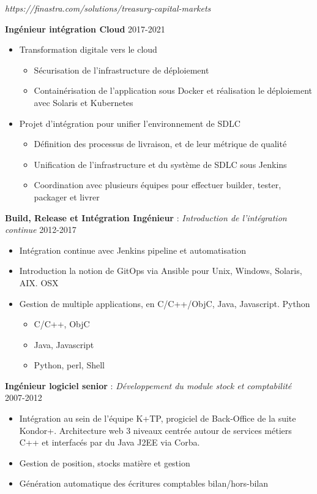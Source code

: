 \documentclass[11pt,a4paper]{moderncv}
\begin{document}
{
\textit{https://finastra.com/solutions/treasury-capital-markets}
\bigskip

\textbf{Ingénieur intégration Cloud} \hfill 2017-2021
\bigskip
	\begin{itemize}%
		\item Transformation digitale vers le cloud
			\begin{itemize}%
				\item Sécurisation de l'infrastructure de déploiement
				\item Containérisation de l'application sous Docker et réalisation le déploiement avec Solaris et Kubernetes
			\end{itemize}
	\end{itemize}
\bigskip
	\begin{itemize}%
	\item	Projet d'intégration pour unifier l'environnement de SDLC
		\begin{itemize}%
				\item Définition des processus de livraison, et de leur métrique de qualité
				\item Unification de l'infrastructure et du système de SDLC sous Jenkins
				\item Coordination avec plusieurs équipes pour effectuer builder, tester, packager  et livrer
		\end{itemize}
	\end{itemize}
\bigskip
 \textbf{Build, Release et Intégration Ingénieur} : \textit{Introduction de l'intégration continue} \hfill 2012-2017
\bigskip
			\begin{itemize}%
				\item Intégration continue avec Jenkins pipeline et automatisation
                \item Introduction la notion de GitOps via Ansible pour Unix, Windows, Solaris, AIX. OSX
				\item Gestion de multiple applications, en C/C++/ObjC, Java, Javascript. Python
					\begin{itemize}
						\item C/C++, ObjC
						\item Java, Javascript
						\item Python, perl, Shell
					\end{itemize}
				\end{itemize}
\bigskip
\textbf{Ingénieur logiciel senior} : \textit{Développement du module stock et comptabilité} \hfill 2007-2012

\bigskip
			\begin{itemize}
				\item Intégration au sein de l'équipe K+TP, progiciel de Back-Office de la suite Kondor+. Architecture web 3 niveaux centrée autour de services métiers C++ et interfacés par du Java J2EE via Corba.
				\item Gestion de position, stocks matière et gestion
				\item Génération automatique des écritures comptables bilan/hors-bilan
			\end{itemize}
}
\end{document}
